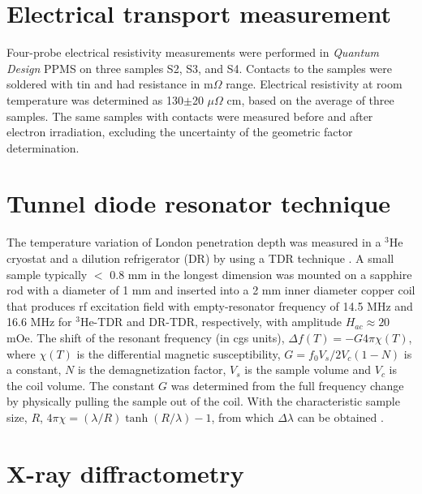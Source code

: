 \documentclass[aps,pra,reprint,superscriptaddress,floatfix]{revtex4-2}
\begin{document}
\section{Electrical transport measurement}
Four-probe electrical resistivity measurements were performed in {\it Quantum Design} PPMS on three samples S2, S3, and S4. Contacts to the samples were soldered with tin \cite{Tanatar2010} and had resistance in m$\Omega$ range. Electrical resistivity at room temperature was determined as 130$\pm$20 $\mu \Omega$ cm, based on the average of three samples. 
The same samples with contacts were measured before and after electron irradiation, excluding the uncertainty of the geometric factor determination.

\section{Tunnel diode resonator technique}

The temperature variation of London penetration depth was measured in a $^3$He cryostat and a dilution refrigerator (DR) by using a TDR technique \cite{Prozorov2011}. 
A small sample typically  $<$ 0.8 mm in the longest dimension was mounted on a sapphire rod with a diameter of 1 mm and inserted into a 2 mm inner diameter copper coil that produces rf excitation field with empty-resonator frequency of 14.5 MHz and 16.6 MHz for $^3$He-TDR and DR-TDR, respectively, with amplitude $H_{ac} \approx 20$ mOe. The shift of the resonant frequency (in cgs units), $\Delta f(T)=-G4\pi\chi(T)$, where $\chi(T)$ is the differential magnetic susceptibility, $G=f_0V_s/2V_c(1-N)$ is a constant, $N$ is the demagnetization factor, $V_s$ is the sample volume and $V_c$ is the coil volume. The constant $G$ was determined from the full frequency change by physically pulling the sample out of the coil. With the characteristic sample size, $R$, $4\pi\chi=(\lambda/R)\tanh (R/\lambda)-1$, from which $\Delta \lambda$ can be obtained \cite{Prozorov2006,Prozorov2011}.


\section{X-ray diffractometry}
\end{document}
